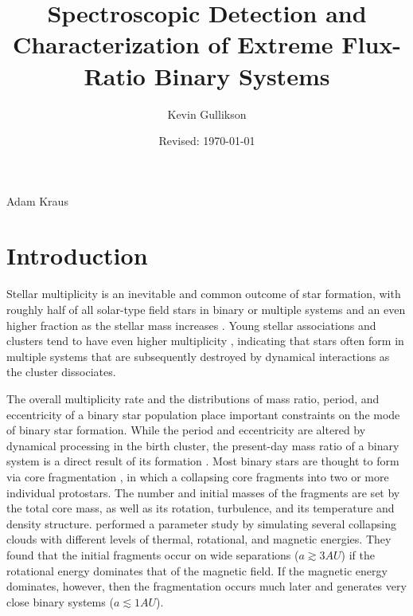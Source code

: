 \documentclass{utthesis}
\begin{document}
\author{Kevin Gullikson}
\title{Spectroscopic Detection and Characterization of Extreme Flux-Ratio Binary Systems}
\date{Revised: \today}

\UTcopyrightlegend %

\begin{UTcommittee}
\end{UTcommittee}


\frontmatter

\setcounter{page}{4}

%
%

\begin{UTabstract}{Adam Kraus}
\lipsum[1]
\end{UTabstract}


\tableofcontents

\listoffigures

\mainmatter

\chapter{Introduction}

Stellar multiplicity is an inevitable and common outcome of star formation, with roughly half of all solar-type field stars in binary or multiple systems \citep{Raghavan2010} and an even higher fraction as the stellar mass increases \citep{Zinnecker2007}. Young stellar associations and clusters tend to have even higher multiplicity \citep{Duchene2013}, indicating that stars often form in multiple systems that are subsequently destroyed by dynamical interactions as the cluster dissociates. 

The overall multiplicity rate and the distributions of mass ratio, period, and eccentricity of a binary star population place important constraints on the mode of binary star formation. While the period and eccentricity are altered by dynamical processing in the birth cluster, the present-day mass ratio of a binary system is a direct result of its formation \citep{Parker2013}. Most binary stars are thought to form via core fragmentation \citep{Boss1979, Boss1986, Bate1995}, in which a collapsing core fragments into two or more individual protostars. The number and initial masses of the fragments are set by the total core mass, as well as its rotation, turbulence, and its temperature and density structure. \citet{Machida2008} performed a parameter study by simulating several collapsing clouds with different levels of thermal, rotational, and magnetic energies. They found that the initial fragments occur on wide separations ($a \gtrsim 3 AU$) if the rotational energy dominates that of the magnetic field. If the magnetic energy dominates, however, then the fragmentation occurs much later and generates very close binary systems ($a \lesssim 1 AU$). 
\end{document}
